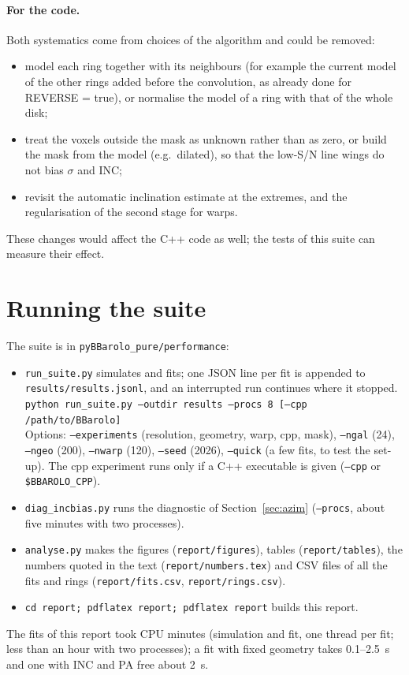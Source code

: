 \documentclass[10pt,a4paper]{article}
\newcommand{\code}[1]{\texttt{#1}}
\begin{document}
\paragraph{For the code.} Both systematics come from choices of the algorithm and could be removed:
\begin{itemize}
\item model each ring together with its neighbours (for example the current model of the other rings
  added before the convolution, as already done for REVERSE = true), or normalise the model of a ring
  with that of the whole disk;
\item treat the voxels outside the mask as unknown rather than as zero, or build the mask from the model
  (e.g.\ dilated), so that the low-S/N line wings do not bias $\sigma$ and INC;
\item revisit the automatic inclination estimate at the extremes, and the regularisation of the second
  stage for warps.
\end{itemize}
These changes would affect the C++ code as well; the tests of this suite can measure their effect.

\appendix
\sloppy
\section{Running the suite}\label{app:run}
The suite is in \code{pyBBarolo\_pure/performance}:
\begin{itemize}
\item \code{run\_suite.py} simulates and fits; one JSON line per fit is appended to
  \code{results/results.jsonl}, and an interrupted run continues where it stopped.\\
  \code{python run\_suite.py --outdir results --procs 8 [--cpp /path/to/BBarolo]}\\
  Options: \code{--experiments} (resolution, geometry, warp, cpp, mask), \code{--ngal} (24),
  \code{--ngeo} (200), \code{--nwarp} (120), \code{--seed} (2026), \code{--quick} (a few fits, to test the
  set-up). The cpp experiment runs only if a C++ executable is given (\code{--cpp} or
  \code{\$BBAROLO\_CPP}).
\item \code{diag\_incbias.py} runs the diagnostic of Section~\ref{sec:azim} (\code{--procs}, about five
  minutes with two processes).
\item \code{analyse.py} makes the figures (\code{report/figures}), tables (\code{report/tables}), the numbers
  quoted in the text (\code{report/numbers.tex}) and CSV files of all the fits and rings
  (\code{report/fits.csv}, \code{report/rings.csv}).
\item \code{cd report; pdflatex report; pdflatex report} builds this report.
\end{itemize}
The \NAll{} fits of this report took \TimeAll{} CPU minutes (simulation and fit, one thread per fit; less
than an hour with two processes); a fit with fixed geometry takes 0.1--2.5~s and one with INC and PA free
about 2~s.
\end{document}
